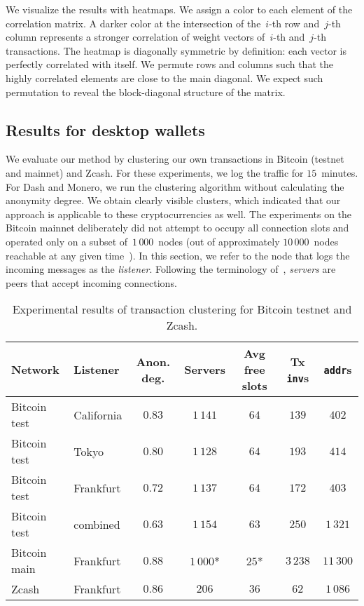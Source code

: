 We visualize the results with heatmaps.
We assign a color to each element of the correlation matrix.
A darker color at the intersection of the~$i$-th row and~$j$-th column represents a stronger correlation of weight vectors of~$i$-th and~$j$-th transactions.
The heatmap is diagonally symmetric by definition: each vector is perfectly correlated with itself.
We permute rows and columns such that the highly correlated elements are close to the main diagonal.
We expect such permutation to reveal the block-diagonal structure of the matrix.


\subsection{Results for desktop wallets}

We evaluate our method by clustering our own transactions in Bitcoin (testnet and mainnet) and Zcash.
For these experiments, we log the traffic for $15$~minutes.
For Dash and Monero, we run the clustering algorithm without calculating the anonymity degree.
We obtain clearly visible clusters, which indicated that our approach is applicable to these cryptocurrencies as well.
The experiments on the Bitcoin mainnet deliberately did not attempt to occupy all connection slots and operated only on a subset of~$1\,000$~nodes (out of approximately $10\,000$~nodes reachable at any given time~\cite{Bitnodes}).
In this section, we refer to the node that logs the incoming messages as the \textit{listener}.
Following the terminology of~\cite{Biryukov2014}, \textit{servers} are peers that accept incoming connections.

\begin{table*}[!t]
	\normalsize
	\caption{Experimental results of transaction clustering for Bitcoin testnet and Zcash.}
	\centering
	\begin{tabular}{|l|l|c|c|c|c|c|}
		\hline
		Network & Listener & Anon\@. deg. & Servers & Avg free slots & Tx \texttt{inv}s & \texttt{addr}s \\
		\hline
		Bitcoin test & California & $0.83$ & $1\,141$ & $64$ & $139$ & $402$ \\
		Bitcoin test & Tokyo & $0.80$ & $1\,128$ & $64$ & $193$ & $414$ \\
		Bitcoin test & Frankfurt & $0.72$ & $1\,137$ & $64$ & $172$ & $403$ \\
		Bitcoin test & combined & $0.63$ & $1\,154$ & $63$ & $250$ & $1\,321$ \\
		Bitcoin main & Frankfurt & $0.88$ & $1\,000$* & $25$* & $3\,238$ & $11\,300$ \\
		Zcash & Frankfurt & $0.86$ & $206$ & $36$ & $62$ & $1\,086$ \\
		\hline
	\end{tabular}
	\label{tab:results}
\end{table*}

